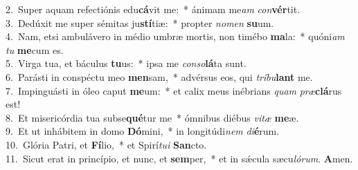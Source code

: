 {2.~}Super aquam refectiónis edu\textbf{cá}vit me:~* ánimam me\textit{am} \textit{con}\textbf{vér}tit.\\
{3.~}Dedúxit me super sémitas ju\textbf{stí}tiæ:~* propter \textit{no}\textit{men} \textbf{su}um.\\
{4.~}Nam, etsi ambulávero in médio umbræ mortis, non timébo \textbf{ma}la:~* quóni\textit{am} \textit{tu} \textbf{me}cum es.\\
{5.~}Virga tua, et báculus \textbf{tu}us:~* ipsa me \textit{con}\textit{so}\textbf{lá}ta sunt.\\
{6.~}Parásti in conspéctu meo \textbf{men}sam,~* advérsus eos, qui \textit{trí}\textit{bu}\textbf{lant} me.\\
{7.~}Impinguásti in óleo caput \textbf{me}um:~* et calix meus inébrians \textit{quam} \textit{præ}\textbf{clá}rus est!\\
{8.~}Et misericórdia tua subse\textbf{qué}tur me~* ómnibus diébus \textit{vi}\textit{tæ} \textbf{me}æ.\\
{9.~}Et ut inhábitem in domo \textbf{Dó}mini,~* in longitúdi\textit{nem} \textit{di}\textbf{é}rum.\\
{10.~}Glória Patri, et \textbf{Fí}lio,~* et Spirí\textit{tu}\textit{i} \textbf{San}cto.\\
{11.~}Sicut erat in princípio, et nunc, et \textbf{sem}per,~* et in sǽcula sæcu\textit{ló}\textit{rum}. \textbf{A}men.\\
